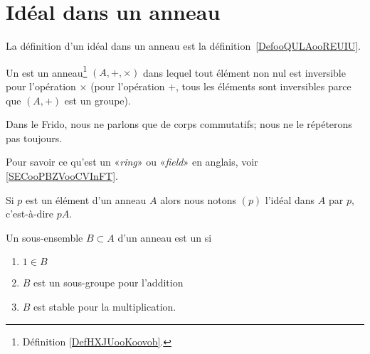 


\section{Idéal dans un anneau}

La définition d'un idéal dans un anneau est la définition~\ref{DefooQULAooREUIU}.

\begin{definition}  \label{DefTMNooKXHUd}
	Un  est un anneau\footnote{Définition \ref{DefHXJUooKoovob}.} \( (A, +,\times)\) dans lequel tout élément non nul est inversible pour l'opération \( \times\) (pour l'opération \( +\), tous les éléments sont inversibles parce que \( (A,+)\) est un groupe).
\end{definition}

\begin{normaltext}
	Dans le Frido, nous ne parlons que de corps commutatifs; nous ne le répéterons pas toujours.
\end{normaltext}

\begin{normaltext}
	Pour savoir ce qu'est un «\emph{ring}» ou «\emph{field}» en anglais, voir \ref{SECooPBZVooCVInFT}.
\end{normaltext}

\begin{definition}  \label{DefSKTooOTauAR}
	Si \( p\) est un élément d'un anneau \( A\) alors nous notons \( (p)\) l'idéal dans \( A\)  par \( p\), c'est-à-dire \( pA\).
\end{definition}

\begin{definition}  \label{DefAJVTPxb}
	Un sous-ensemble \( B\subset A\) d'un anneau est un  si
	\begin{enumerate}
		\item
		      \( 1\in B\)
		\item
		      \( B\) est un sous-groupe pour l'addition
		\item
		      \( B\) est stable pour la multiplication.
	\end{enumerate}
\end{definition}

